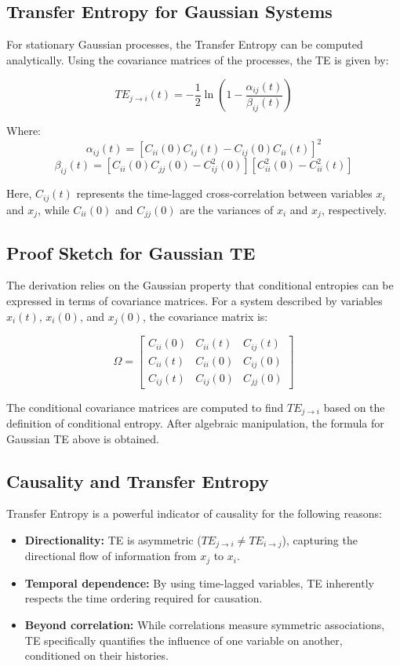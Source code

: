 \documentclass[English, Lau, oneside]{sapthesis}
\begin{document}
\begin{itemize}
\subsection*{Transfer Entropy for Gaussian Systems}
For stationary Gaussian processes, the Transfer Entropy can be computed analytically. Using the covariance matrices of the processes, the TE is given by:

\[
TE_{j \to i}(t) = -\frac{1}{2} \ln \left(1 - \frac{\alpha_{ij}(t)}{\beta_{ij}(t)}\right)
\]

Where:
\[
\alpha_{ij}(t) = [C_{ii}(0)C_{ij}(t) - C_{ij}(0)C_{ii}(t)]^2
\]
\[
\beta_{ij}(t) = [C_{ii}(0)C_{jj}(0) - C_{ij}^2(0)][C_{ii}^2(0) - C_{ii}^2(t)]
\]

Here, \(C_{ij}(t)\) represents the time-lagged cross-correlation between variables \(x_i\) and \(x_j\), while \(C_{ii}(0)\) and \(C_{jj}(0)\) are the variances of \(x_i\) and \(x_j\), respectively.

\subsection*{Proof Sketch for Gaussian TE}
The derivation relies on the Gaussian property that conditional entropies can be expressed in terms of covariance matrices. For a system described by variables \(x_i(t)\), \(x_i(0)\), and \(x_j(0)\), the covariance matrix is:

\[
\Omega = \begin{bmatrix}
C_{ii}(0) & C_{ii}(t) & C_{ij}(t) \\
C_{ii}(t) & C_{ii}(0) & C_{ij}(0) \\
C_{ij}(t) & C_{ij}(0) & C_{jj}(0)
\end{bmatrix}
\]

The conditional covariance matrices are computed to find \(TE_{j \to i}\) based on the definition of conditional entropy. After algebraic manipulation, the formula for Gaussian TE above is obtained.

\subsection*{Causality and Transfer Entropy}
Transfer Entropy is a powerful indicator of causality for the following reasons:
\begin{itemize}
    \item \textbf{Directionality:} TE is asymmetric (\(TE_{j \to i} \neq TE_{i \to j}\)), capturing the directional flow of information from \(x_j\) to \(x_i\).
    \item \textbf{Temporal dependence:} By using time-lagged variables, TE inherently respects the time ordering required for causation.
    \item \textbf{Beyond correlation:} While correlations measure symmetric associations, TE specifically quantifies the influence of one variable on another, conditioned on their histories.
\end{itemize}


\end{itemize}
\end{document}

